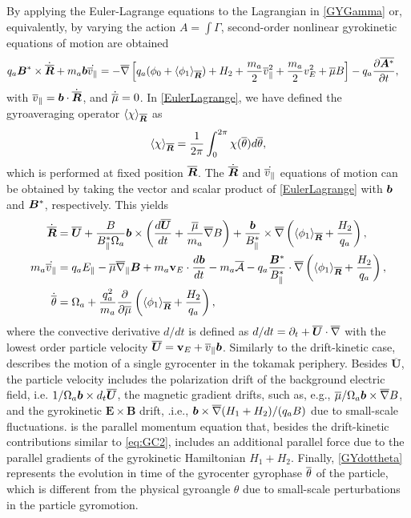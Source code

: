 By applying the Euler-Lagrange equations to the Lagrangian in \cref{GYGamma} or, equivalently, by varying the action ${A} = \int {\Gamma} $, second-order nonlinear  gyrokinetic equations of motion are obtained
%
\begin{align} \label{EulerLagrange}
  q_a \bm{B}^* \times \dot{\overline{\bm{R}}} + m_a \bm{b} \dot{\overline{v}_{\parallel}}  & = -\overline{\nabla} \left[ q_a ( \phi_0 + \left<  \phi_1 \right>_{\overline{\bm{R}}}) +H_2 + \frac{m_a}{2}\overline{v}_{\parallel}^2 + \frac{m_a}{2} v_E^2 + \overline{\mu} B \right] - q_a \frac{\partial  \overline{\bm{A}^*}}{\partial t},
\end{align}
%
with $\overline{v}_{\parallel} = \bm{b} \cdot \dot{\overline{\bm{R}}}$, and $\dot{\overline{\mu}}=0$.
%
In \cref{EulerLagrange}, we have defined the gyroaveraging operator $\left<\chi\right>_{\overline{\bm{R}}}$ as
%
\begin{equation}
    \left< \chi \right>_{\overline{\bm{R}}} = \frac{1}{2\pi}\int_0^{2\pi} \chi (\overline \theta) d\overline \theta,
\label{overlinegyaveroperator}
\end{equation}
%
which is performed at fixed position $\overline{\bm{R}}$.
%
The $\dot{\overline{\bm{R}}}$ and $\dot{\overline{v}_{\parallel}}$ equations of motion can be obtained by taking the vector and scalar product  of \cref{EulerLagrange} with $\bm{b}$ and $\bm{B}^*$, respectively.
%
This yields
%
\begin{align} 
    \dot{ \overline{\bm{R}}} & = \overline{\bm{U}} + \frac{B}{ B^*_{\parallel}\Omega_a } \bm{b} \times \left( \frac{d \overline{\bm{U}} }{d t}  + \frac{\overline{\mu}}{m_a} \overline{\nabla} B\right) +  \frac{\bm{b}}{B^*_{\parallel}}  \times \overline{\nabla} \left(\left<  \phi_1 \right>_{\overline{\bm{R}}}+\frac{H_2}{q_a}\right), \label{GYdotR} \\ 
    m_a \dot{\overline{v}_{\parallel}} & = q_a E_{\parallel}  - \overline{\mu} \overline \nabla_\parallel \bm{B}  + m_a \mathbf v_E \cdot \frac{d \bm{b}}{d t} - {m_a}\overline{\mathcal{A}}- q_a\frac{\bm{B}^*}{B_{\parallel}^*} \cdot \overline{\nabla} \left(\left<  \phi_1 \right>_{\overline{\bm{R}}}+\frac{H_2}{q_a}\right), \label{GYdotvparallel}   \\ 
    \dot {\overline{\theta}} & =   \Omega_a + \frac{q_a^2}{m_a } \frac{ \partial }{\partial \overline{\mu}}  \left(\left<  \phi_1 \right>_{\overline{\bm{R}}}+\frac{H_2}{q_a}\right), \label{GYdottheta}
\end{align}
%
where the convective derivative $d/dt$ is defined as $d/dt = \partial_t  + \overline{\bm{U}} \cdot \overline{\nabla}$ with the lowest order particle velocity $\overline{\bm{U}} = \mathbf v_E + \overline{v}_{\parallel} \bm{b}$.
%
Similarly to the drift-kinetic case,  describes the motion of a single gyrocenter in the tokamak periphery.
%
Besides $\overline{\mathbf U}$, the particle velocity includes the polarization drift of the background electric field, i.e. $1/\Omega_a \bm{b} \times d_t \overline{\bm{U}}$, the magnetic gradient drifts, such as, e.g., $\overline{\mu}/ \Omega_a \bm{b} \times \overline{\nabla} B$, and the gyrokinetic $\mathbf E \times \mathbf B$ drift, .i.e., $\bm{b} \times \overline{\nabla} (H_1+H_2)/(q_a B)$ due to small-scale fluctuations.
%
 is the parallel momentum equation that, besides the drift-kinetic contributions similar to \cref{eq:GC2}, includes an additional parallel force due to the parallel gradients of the gyrokinetic Hamiltonian $H_1+H_2$.
%
Finally, \cref{GYdottheta} represents the evolution in time of the gyrocenter gyrophase $\overline{\theta}$ of the particle, which is different from the physical gyroangle $\theta$ due to small-scale perturbations in the particle gyromotion.

